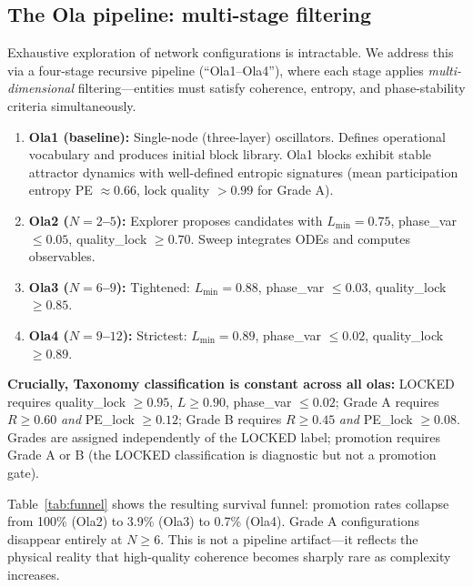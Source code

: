 \documentclass[reprint,aps,prb,superscriptaddress,floatfix]{revtex4-2}
\begin{document}
\subsection{The Ola pipeline: multi-stage filtering}

Exhaustive exploration of network configurations is intractable. We address this via a four-stage recursive pipeline (``Ola1--Ola4''), where each stage applies \emph{multi-dimensional} filtering---entities must satisfy coherence, entropy, and phase-stability criteria simultaneously.

\begin{enumerate}
\item \textbf{Ola1 (baseline):} Single-node (three-layer) oscillators. Defines operational vocabulary and produces initial block library. Ola1 blocks exhibit stable attractor dynamics with well-defined entropic signatures (mean participation entropy PE $\approx 0.66$, lock quality $>0.99$ for Grade A).

\item \textbf{Ola2 ($N = 2$--$5$):} Explorer proposes candidates with $L_{\min} = 0.75$, phase\_var $\leq 0.05$, quality\_lock $\geq 0.70$. Sweep integrates ODEs and computes observables.

\item \textbf{Ola3 ($N = 6$--$9$):} Tightened: $L_{\min} = 0.88$, phase\_var $\leq 0.03$, quality\_lock $\geq 0.85$.

\item \textbf{Ola4 ($N = 9$--$12$):} Strictest: $L_{\min} = 0.89$, phase\_var $\leq 0.02$, quality\_lock $\geq 0.89$.
\end{enumerate}

\textbf{Crucially, Taxonomy classification is constant across all olas:} LOCKED requires quality\_lock $\geq 0.95$, $L \geq 0.90$, phase\_var $\leq 0.02$; Grade A requires $R \geq 0.60$ \emph{and} PE\_lock $\geq 0.12$; Grade B requires $R \geq 0.45$ \emph{and} PE\_lock $\geq 0.08$. Grades are assigned independently of the LOCKED label; promotion requires Grade A or B (the LOCKED classification is diagnostic but not a promotion gate).

Table~\ref{tab:funnel} shows the resulting survival funnel: promotion rates collapse from 100\% (Ola2) to 3.9\% (Ola3) to 0.7\% (Ola4). Grade A configurations disappear entirely at $N \geq 6$. This is not a pipeline artifact---it reflects the physical reality that high-quality coherence becomes sharply rare as complexity increases.
\end{document}
